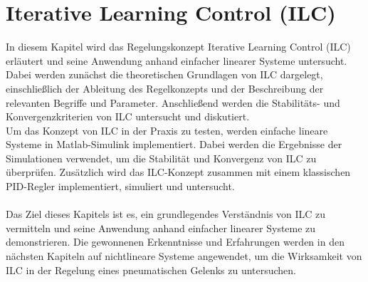 \chapter{Iterative Learning Control (ILC)}
\label{ch:ILC}
In diesem Kapitel wird das Regelungskonzept Iterative Learning Control (ILC) erläutert und seine Anwendung anhand einfacher linearer Systeme untersucht. Dabei werden zunächst die theoretischen Grundlagen von ILC dargelegt, einschließlich der Ableitung des Regelkonzepts und der Beschreibung der relevanten Begriffe und Parameter. Anschließend werden die Stabilitäts- und Konvergenzkriterien von ILC untersucht und diskutiert. \\
Um das Konzept von ILC in der Praxis zu testen, werden einfache lineare Systeme in Matlab-Simulink implementiert. Dabei werden die Ergebnisse der Simulationen verwendet, um die Stabilität und Konvergenz von ILC zu überprüfen. Zusätzlich wird das ILC-Konzept zusammen mit einem klassischen PID-Regler implementiert, simuliert und untersucht.\\  
\\
Das Ziel dieses Kapitels ist es, ein grundlegendes Verständnis von ILC zu vermitteln und seine Anwendung anhand einfacher linearer Systeme zu demonstrieren. Die gewonnenen Erkenntnisse und Erfahrungen werden in den nächsten Kapiteln auf nichtlineare Systeme angewendet, um die Wirksamkeit von ILC in der Regelung eines pneumatischen Gelenks zu untersuchen.

